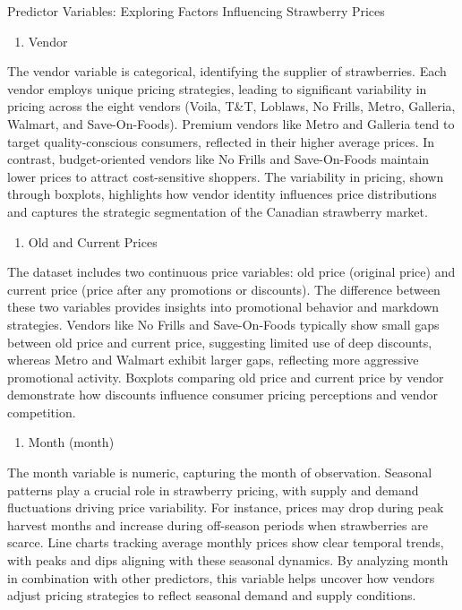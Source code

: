 \documentclass[
  letterpaper,
  DIV=11,
  numbers=noendperiod]{scrartcl}
\providecommand{\tightlist}{%
  \setlength{\itemsep}{0pt}\setlength{\parskip}{0pt}}\usepackage{longtable,booktabs,array}
\begin{document}
Predictor Variables: Exploring Factors Influencing Strawberry Prices

\begin{enumerate}
\def\labelenumi{\arabic{enumi}.}
\tightlist
\item
  Vendor
\end{enumerate}

The vendor variable is categorical, identifying the supplier of
strawberries. Each vendor employs unique pricing strategies, leading to
significant variability in pricing across the eight vendors (Voila,
T\&T, Loblaws, No Frills, Metro, Galleria, Walmart, and Save-On-Foods).
Premium vendors like Metro and Galleria tend to target quality-conscious
consumers, reflected in their higher average prices. In contrast,
budget-oriented vendors like No Frills and Save-On-Foods maintain lower
prices to attract cost-sensitive shoppers. The variability in pricing,
shown through boxplots, highlights how vendor identity influences price
distributions and captures the strategic segmentation of the Canadian
strawberry market.

\begin{enumerate}
\def\labelenumi{\arabic{enumi}.}
\setcounter{enumi}{1}
\tightlist
\item
  Old and Current Prices
\end{enumerate}

The dataset includes two continuous price variables: old price (original
price) and current price (price after any promotions or discounts). The
difference between these two variables provides insights into
promotional behavior and markdown strategies. Vendors like No Frills and
Save-On-Foods typically show small gaps between old price and current
price, suggesting limited use of deep discounts, whereas Metro and
Walmart exhibit larger gaps, reflecting more aggressive promotional
activity. Boxplots comparing old price and current price by vendor
demonstrate how discounts influence consumer pricing perceptions and
vendor competition.

\begin{enumerate}
\def\labelenumi{\arabic{enumi}.}
\setcounter{enumi}{2}
\tightlist
\item
  Month (month)
\end{enumerate}

The month variable is numeric, capturing the month of observation.
Seasonal patterns play a crucial role in strawberry pricing, with supply
and demand fluctuations driving price variability. For instance, prices
may drop during peak harvest months and increase during off-season
periods when strawberries are scarce. Line charts tracking average
monthly prices show clear temporal trends, with peaks and dips aligning
with these seasonal dynamics. By analyzing month in combination with
other predictors, this variable helps uncover how vendors adjust pricing
strategies to reflect seasonal demand and supply conditions.
\end{document}
